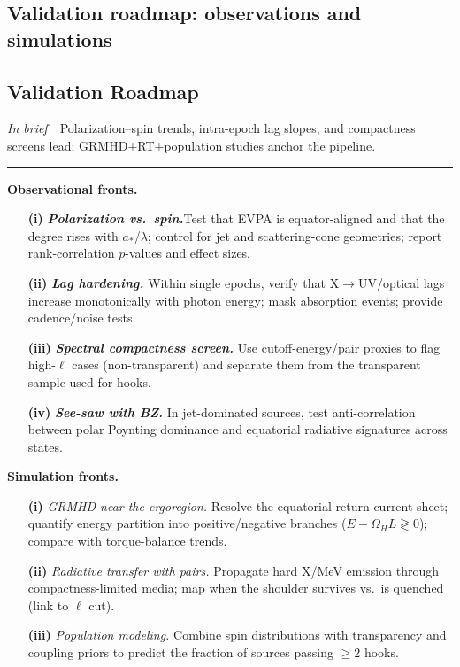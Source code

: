 \documentclass[twocolumn]{aastex701}
\providecommand{\tldr}[1]{%
  \noindent\textit{In brief}\ \textemdash\ #1%
  \par\smallskip
  \noindent\rule{\columnwidth}{0.2pt}\par\medskip
}
\begin{document}
\subsection*{Validation roadmap: observations and simulations}
\subsection{Validation Roadmap}\label{sec:roadmap}
\tldr{Polarization--spin trends, intra-epoch lag slopes, and compactness screens lead; GRMHD+RT+population studies anchor the pipeline.}

\noindent\textbf{Observational fronts.}
\begin{enumerate}
  \item[\textbf{(i)}] \textit{\textbf{Polarization vs.\ spin.}}Test that EVPA is equator-aligned and that the degree rises with $a_\ast$/$\lambda$; control for jet and scattering-cone geometries; report rank-correlation $p$-values and effect sizes.
  \item[\textbf{(ii)}] \textit{\textbf{Lag hardening.}} Within single epochs, verify that X$\to$UV/optical lags increase monotonically with photon energy; mask absorption events; provide cadence/noise tests.
  \item[\textbf{(iii)}] \textit{\textbf{Spectral compactness screen.}} Use cutoff-energy/pair proxies to flag high-$\ell$ cases (non-transparent) and separate them from the transparent sample used for hooks.
  \item[\textbf{(iv)}] \textit{\textbf{See-saw with BZ.}} In jet-dominated sources, test anti-correlation between polar Poynting dominance and equatorial radiative signatures across states.
\end{enumerate}

\noindent\textbf{Simulation fronts.}
\begin{enumerate}
  \item[\textbf{(i)}] \textit{GRMHD near the ergoregion.} Resolve the equatorial return current sheet; quantify energy partition into positive/negative branches ($E-\Omega_H L\gtrless 0$); compare with torque-balance trends.
  \item[\textbf{(ii)}] \textit{Radiative transfer with pairs.} Propagate hard X/MeV emission through compactness-limited media; map when the shoulder survives vs.\ is quenched (link to $\ell$ cut).
  \item[\textbf{(iii)}] \textit{Population modeling.} Combine spin distributions with transparency and coupling priors to predict the fraction of sources passing $\ge 2$ hooks.
\end{enumerate}
\end{document}
